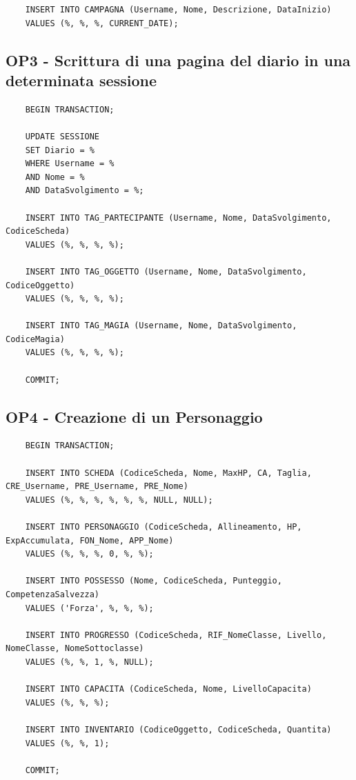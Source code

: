 \documentclass[a4paper,12pt]{report}
\begin{document}
\begin{lstlisting}
    INSERT INTO CAMPAGNA (Username, Nome, Descrizione, DataInizio)
    VALUES (%, %, %, CURRENT_DATE);
\end{lstlisting}

\subsection{OP3 - Scrittura di una pagina del diario in una determinata sessione}

\begin{lstlisting}
    BEGIN TRANSACTION;

    UPDATE SESSIONE
    SET Diario = %
    WHERE Username = % 
    AND Nome = % 
    AND DataSvolgimento = %;

    INSERT INTO TAG_PARTECIPANTE (Username, Nome, DataSvolgimento, CodiceScheda)
    VALUES (%, %, %, %);

    INSERT INTO TAG_OGGETTO (Username, Nome, DataSvolgimento, CodiceOggetto)
    VALUES (%, %, %, %);

    INSERT INTO TAG_MAGIA (Username, Nome, DataSvolgimento, CodiceMagia)
    VALUES (%, %, %, %);

    COMMIT;
\end{lstlisting}

\subsection{OP4 - Creazione di un Personaggio}

\begin{lstlisting}
    BEGIN TRANSACTION;

    INSERT INTO SCHEDA (CodiceScheda, Nome, MaxHP, CA, Taglia, CRE_Username, PRE_Username, PRE_Nome)
    VALUES (%, %, %, %, %, %, NULL, NULL);

    INSERT INTO PERSONAGGIO (CodiceScheda, Allineamento, HP, ExpAccumulata, FON_Nome, APP_Nome)
    VALUES (%, %, %, 0, %, %);

    INSERT INTO POSSESSO (Nome, CodiceScheda, Punteggio, CompetenzaSalvezza)
    VALUES ('Forza', %, %, %);

    INSERT INTO PROGRESSO (CodiceScheda, RIF_NomeClasse, Livello, NomeClasse, NomeSottoclasse)
    VALUES (%, %, 1, %, NULL);

    INSERT INTO CAPACITA (CodiceScheda, Nome, LivelloCapacita)
    VALUES (%, %, %);

    INSERT INTO INVENTARIO (CodiceOggetto, CodiceScheda, Quantita)
    VALUES (%, %, 1);

    COMMIT;
\end{lstlisting}
\end{document}
